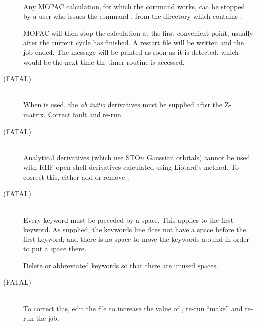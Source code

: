 \begin{description}
\item[]~\\
Any MOPAC calculation, for which the  command works, can be stopped 
by  a  user  who issues the command ,  from the
directory which contains .

MOPAC will then stop the calculation at the first convenient point, usually 
after  the  current cycle has finished.  A restart file will be written and the
job ended.  The message will be printed as soon as it is detected, which would
be the next time the timer routine is accessed.
                    
\item[ (FATAL)]~\\
When  is used, the {\em ab initio} derivatives must be supplied
after the Z-matrix.  Correct fault and re-run.

\item[ (FATAL)]~\\
Analytical derivatives (which use STO$n$ Gaussian orbitals) cannot be
used with RHF open shell derivatives calculated using Liotard's method.
To correct this, either add  or remove .

\item[ (FATAL)]~\\
Every keyword must be preceded by a space.  This applies to the first keyword.
As supplied, the keywords line does not have a space before the first keyword,
and there is no space to move the keywords around in order to put a space there.

Delete or abbreviated keywords so that there are unused spaces.

\item[ (FATAL)]~\\
To correct this, edit the file  to increase the value of 
, re-run ``make'' and re-run the job.
                      

\end{description}

